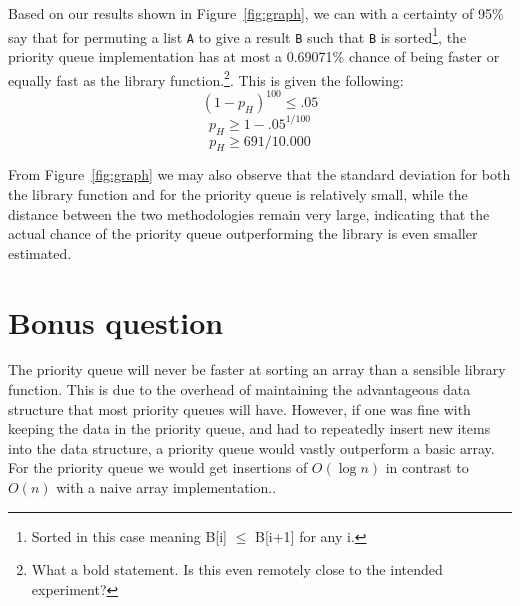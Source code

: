 \documentclass[a5paper]{article}
\begin{document}
Based on our results shown in Figure~\ref{fig:graph}, we can with a certainty of 95\% say that for permuting a list \texttt{A} to give a result \texttt{B} such that \texttt{B} is sorted\footnote{Sorted in this case meaning B[i] $\le$ B[i+1] for any i.}, the priority queue implementation has at most a 0.69071\% chance of being faster or equally fast as the library function.\footnote{What a bold statement. Is this even remotely close to the intended experiment?}. This is given the following:
\[ {(1-p_{H})}^{100} \le.05 \]
\[ p_{H}\ge 1-.05^{1/100} \]
\[ p_{H}\ge 691/10.000 \]

From Figure~\ref{fig:graph} we may also observe that the standard deviation for both the library function and for the priority queue is relatively small, while the distance between the two methodologies remain very large, indicating that the actual chance of the priority queue outperforming the library is even smaller estimated. 

\section{Bonus question}
The priority queue will never be faster at sorting an array than a sensible library function. This is due to the overhead of maintaining the advantageous data structure that most priority queues will have. However, if one was fine with keeping the data in the priority queue, and had to repeatedly insert new items into the data structure, a priority queue would vastly outperform a basic array. For the priority queue we would get insertions of $O(\log n)$ in contrast to $O(n)$ with a naive array implementation..
\end{document}

